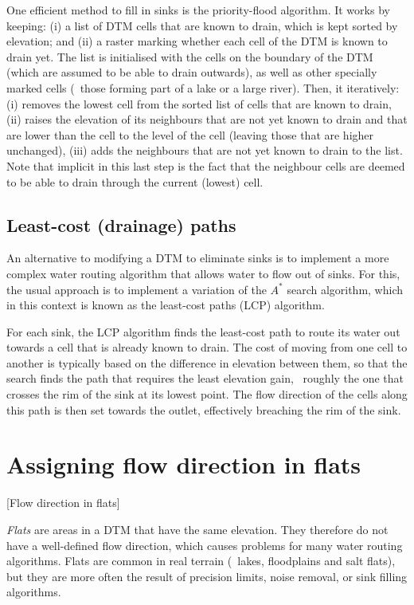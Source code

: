 One efficient method to fill in sinks is the priority-flood algorithm.
It works by keeping: (i) a list of DTM cells that are known to drain, which is kept sorted by elevation; and (ii) a raster marking whether each cell of the DTM is known to drain yet.
The list is initialised with the cells on the boundary of the DTM (which are assumed to be able to drain outwards), as well as other specially marked cells (\eg\ those forming part of a lake or a large river)\@.
Then, it iteratively: (i) removes the lowest cell from the sorted list of cells that are known to drain, (ii) raises the elevation of its neighbours that are not yet known to drain and that are lower than the cell to the level of the cell (leaving those that are higher unchanged), (iii) adds the neighbours that are not yet known to drain to the list.
Note that implicit in this last step is the fact that the neighbour cells are deemed to be able to drain through the current (lowest) cell.

\subsection{Least-cost (drainage) paths}

An alternative to modifying a DTM to eliminate sinks is to implement a more complex water routing algorithm that allows water to flow out of sinks.
For this, the usual approach is to implement a variation of the \(A^{*}\) search algorithm, which in this context is known as the least-cost paths (LCP) algorithm.

For each sink, the LCP algorithm finds the least-cost path to route its water out towards a cell that is already known to drain.
The cost of moving from one cell to another is typically based on the difference in elevation between them, so that the search finds the path that requires the least elevation gain, \ie\ roughly the one that crosses the rim of the sink at its lowest point.
The flow direction of the cells along this path is then set towards the outlet, effectively breaching the rim of the sink.

\section{Assigning flow direction in flats}[Flow direction in flats]%
\label{se:flats}

\emph{Flats} are areas in a DTM that have the same elevation.
They therefore do not have a well-defined flow direction, which causes problems for many water routing algorithms.
Flats are common in real terrain (\eg\ lakes, floodplains and salt flats), but they are more often the result of precision limits, noise removal, or sink filling algorithms.

